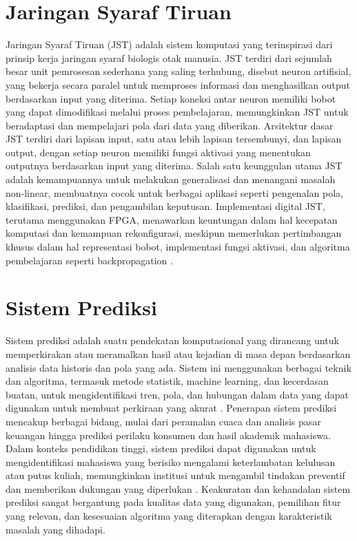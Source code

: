 \section{Jaringan Syaraf Tiruan}
Jaringan Syaraf Tiruan (JST) adalah sistem komputasi yang terinspirasi dari prinsip kerja jaringan syaraf biologis otak manusia. JST terdiri dari sejumlah besar unit pemrosesan sederhana yang saling terhubung, disebut neuron artifisial, yang bekerja secara paralel untuk memproses informasi dan menghasilkan output berdasarkan input yang diterima. Setiap koneksi antar neuron memiliki bobot yang dapat dimodifikasi melalui proses pembelajaran, memungkinkan JST untuk beradaptasi dan mempelajari pola dari data yang diberikan. Arsitektur dasar JST terdiri dari lapisan input, satu atau lebih lapisan tersembunyi, dan lapisan output, dengan setiap neuron memiliki fungsi aktivasi yang menentukan outputnya berdasarkan input yang diterima. Salah satu keunggulan utama JST adalah kemampuannya untuk melakukan generalisasi dan menangani masalah non-linear, membuatnya cocok untuk berbagai aplikasi seperti pengenalan pola, klasifikasi, prediksi, dan pengambilan keputusan. Implementasi digital JST, terutama menggunakan FPGA, menawarkan keuntungan dalam hal kecepatan komputasi dan kemampuan rekonfigurasi, meskipun memerlukan pertimbangan khusus dalam hal representasi bobot, implementasi fungsi aktivasi, dan algoritma pembelajaran seperti backpropagation \cite{amrutha2018performance}.

\section{Sistem Prediksi}
Sistem prediksi adalah suatu pendekatan komputasional yang dirancang untuk memperkirakan atau meramalkan hasil atau kejadian di masa depan berdasarkan analisis data historis dan pola yang ada. Sistem ini menggunakan berbagai teknik dan algoritma, termasuk metode statistik, machine learning, dan kecerdasan buatan, untuk mengidentifikasi tren, pola, dan hubungan dalam data yang dapat digunakan untuk membuat perkiraan yang akurat \cite{dengen2018student}. Penerapan sistem prediksi mencakup berbagai bidang, mulai dari peramalan cuaca dan analisis pasar keuangan hingga prediksi perilaku konsumen dan hasil akademik mahasiswa. Dalam konteks pendidikan tinggi, sistem prediksi dapat digunakan untuk mengidentifikasi mahasiswa yang berisiko mengalami keterlambatan kelulusan atau putus kuliah, memungkinkan institusi untuk mengambil tindakan preventif dan memberikan dukungan yang diperlukan \cite{wirawan2019application}. Keakuratan dan kehandalan sistem prediksi sangat bergantung pada kualitas data yang digunakan, pemilihan fitur yang relevan, dan kesesuaian algoritma yang diterapkan dengan karakteristik masalah yang dihadapi.
